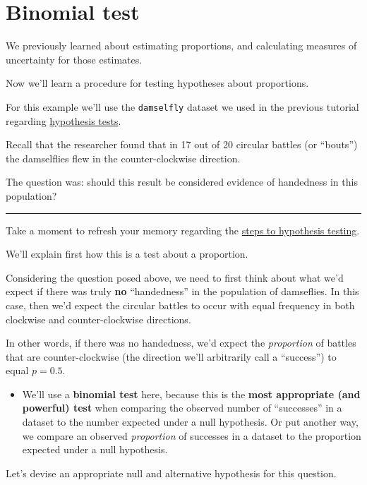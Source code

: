 \documentclass[
]{book}
\providecommand{\tightlist}{%
  \setlength{\itemsep}{0pt}\setlength{\parskip}{0pt}}
\begin{document}
\section{Binomial test}\label{binom_test}

We previously learned about estimating proportions, and calculating measures of uncertainty for those estimates.

Now we'll learn a procedure for testing hypotheses about proportions.

For this example we'll use the \texttt{damselfly} dataset we used in the previous tutorial regarding \hyperref[hypothesis]{hypothesis tests}.

Recall that the researcher found that in 17 out of 20 circular battles (or ``bouts'') the damselflies flew in the counter-clockwise direction.

The question was: should this result be considered evidence of handedness in this population?

\begin{center}\rule{0.5\linewidth}{0.5pt}\end{center}

Take a moment to refresh your memory regarding the \hyperref[hyp_steps]{steps to hypothesis testing}.

We'll explain first how this is a test about a proportion.

Considering the question posed above, we need to first think about what we'd expect if there was truly \textbf{no} ``handedness'' in the population of damseflies. In this case, then we'd expect the circular battles to occur with equal frequency in both clockwise and counter-clockwise directions.

In other words, if there was no handedness, we'd expect the \emph{proportion} of battles that are counter-clockwise (the direction we'll arbitrarily call a ``success'') to equal \({p} = 0.5\).

\begin{itemize}
\tightlist
\item
  We'll use a \textbf{binomial test} here, because this is the \textbf{most appropriate (and powerful) test} when comparing the observed number of ``successes'' in a dataset to the number expected under a null hypothesis. Or put another way, we compare an observed \emph{proportion} of successes in a dataset to the proportion expected under a null hypothesis.
\end{itemize}

Let's devise an appropriate null and alternative hypothesis for this question.
\end{document}
